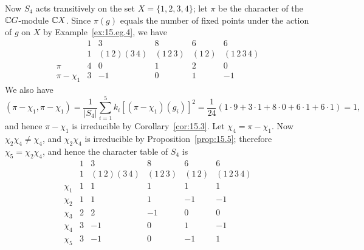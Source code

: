 \documentclass[../Odyssey_Project.tex]{subfiles}
\begin{document}
\begin{example}
Now $S_4$ acts transitively on the set $X = \{1, 2, 3, 4\}$; let $\pi$ be the character of the $\mathbb{C} G$-module $\mathbb{C} X$. Since $\pi(g)$ equals the number of fixed points under the action of $g$ on $X$ by Example~\ref{ex:15.eg.4}, we have
\[
    \begin{array}{c|ccccc}
        & 1 & 3 & 8 & 6 & 6 \\
        & 1 & (1\,2)(3\,4) & (1\,2\,3) & (1\,2) & (1\,2\,3\,4) \\
        \hline
        \pi & 4 & 0 & 1 & 2 & 0 \\
        \pi - \chi_1 & 3 & -1 & 0 & 1 & -1
    \end{array}
\]
We also have
\[
    (\pi - \chi_1, \pi - \chi_1) = \frac{1}{|S_4|} \sum_{i=1}^{5} k_i [(\pi - \chi_1)(g_i)]^2 = \frac{1}{24}(1 \cdot 9 + 3 \cdot 1 + 8 \cdot 0 + 6 \cdot 1 + 6 \cdot 1) = 1,
\]
and hence $\pi - \chi_1$ is irreducible by Corollary~\ref{cor:15.3}. Let $\chi_4 = \pi - \chi_1$. Now $\chi_2 \chi_4 \neq \chi_4$, and $\chi_2 \chi_4$ is irreducible by Proposition~\ref{prop:15.5}; therefore $\chi_5 = \chi_2 \chi_4$, and hence the character table of $S_4$ is
\[
    \begin{array}{c|ccccc}
        & 1 & 3 & 8 & 6 & 6 \\
        & 1 & (1\,2)(3\,4) & (1\,2\,3) & (1\,2) & (1\,2\,3\,4) \\
        \hline
        \chi_1 & 1 & 1 & 1 & 1 & 1 \\
        \chi_2 & 1 & 1 & 1 & -1 & -1 \\
        \chi_3 & 2 & 2 & -1 & 0 & 0 \\
        \chi_4 & 3 & -1 & 0 & 1 & -1 \\
        \chi_5 & 3 & -1 & 0 & -1 & 1
    \end{array}
\]
\end{example}
\end{document}
